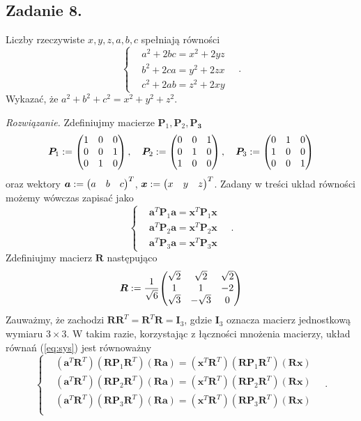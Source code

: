 \documentclass{myclass}
\begin{document}
\subsection*{Zadanie 8.} Liczby rzeczywiste \(x,y,z,a,b,c\) spełniają równości
\[
\begin{cases}
&a^2 + 2bc = x^2 + 2yz\\
&b^2 + 2ca = y^2 + 2zx\\
&c^2 + 2ab = z^2 + 2xy
\end{cases}\quad.
\]
Wykazać, że \(a^2 + b^2 + c^2 = x^2 + y^2 + z^2\).

\bigskip

\textit{Rozwiązanie.} Zdefiniujmy macierze \(\bm{P}_1, \bm{P}_2, \bm{P_3}\)
\[
\bm{P}_1 := \mqty(1&0&0\\0&0&1\\0&1&0)\,,\quad \bm{P}_2 := \mqty(0&0&1\\0&1&0\\1&0&0)\,,\quad \bm{P}_3 := \mqty(0&1&0\\1&0&0\\0&0&1)
\]
oraz wektory \(\bm{a} := \mqty(a&b&c)^T\), \(\bm{x}:=\mqty(x&y&z)^T\). Zadany w treści układ
równości możemy wówczas zapisać jako
\[
\begin{cases}\label{eq:sys}
&\bm{a}^T\bm{P}_1\bm{a} = \bm{x}^T\bm{P}_1\bm{x}\\
&\bm{a}^T\bm{P}_2\bm{a} = \bm{x}^T\bm{P}_2\bm{x}\\
&\bm{a}^T\bm{P}_3\bm{a} = \bm{x}^T\bm{P}_3\bm{x}
\end{cases}\tag{$\star$}\quad.
\]
Zdefiniujmy macierz \(\bm{R}\) następująco
\[
\bm{R} := \frac{1}{\sqrt{6}}\mqty(\sqrt{2}&\sqrt{2} &\sqrt{2}\\
                                  1       &1        &-2      \\
                                  \sqrt{3}&-\sqrt{3}&0         )
\]
Zauważmy, że zachodzi \(\bm{R}\bm{R}^T = \bm{R}^T\bm{R} = \bm{I}_3\), gdzie \(\bm{I}_3\) oznacza
macierz jednostkową wymiaru \(3\times3\). W takim razie, korzystając z łączności
mnożenia macierzy, układ równań (\ref{eq:sys}) jest równoważny
\[
\begin{cases}
&(\bm{a}^T\bm{R}^T)(\bm{R}\bm{P}_1\bm{R}^T)(\bm{R}\bm{a}) = (\bm{x}^T\bm{R}^T)(\bm{R}\bm{P}_1\bm{R}^T)(\bm{R}\bm{x})\\
&(\bm{a}^T\bm{R}^T)(\bm{R}\bm{P}_2\bm{R}^T)(\bm{R}\bm{a}) = (\bm{x}^T\bm{R}^T)(\bm{R}\bm{P}_2\bm{R}^T)(\bm{R}\bm{x})\\
&(\bm{a}^T\bm{R}^T)(\bm{R}\bm{P}_3\bm{R}^T)(\bm{R}\bm{a}) = (\bm{x}^T\bm{R}^T)(\bm{R}\bm{P}_3\bm{R}^T)(\bm{R}\bm{x})\\
\end{cases}\quad.
\]
\end{document}
